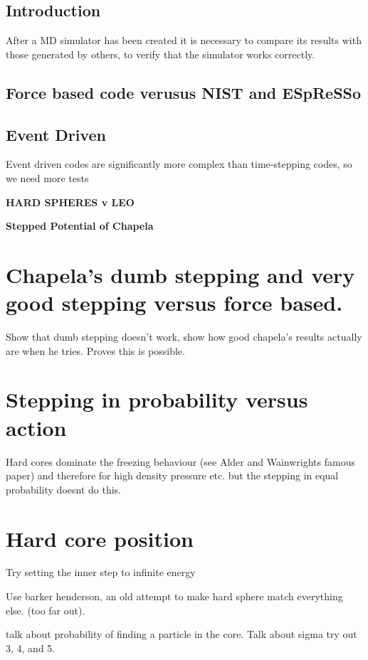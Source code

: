 \documentclass[12pt]{UoAthesis}
\begin{document}
\subsection{Introduction} 
After a MD simulator has been created it is necessary to compare its
results with those generated by others, to verify that the simulator
works correctly.

\subsection{Force based code verusus NIST and ESpReSSo}

\subsection{Event Driven}
Event driven codes are significantly more complex than time-stepping codes, so we need more tests

{\bf HARD SPHERES v LEO}

{\bf Stepped Potential of Chapela}

\section{Chapela's dumb stepping and very good stepping versus force based. }

Show that dumb stepping doesn't work, show how good chapela's results actually are when he tries. Proves this is possible.

\section{Stepping in probability versus action}

Hard cores dominate the freezing behaviour (see Alder and Wainwrights
famous paper) and therefore for high density pressure etc. but the stepping in equal probability doesnt do this.

\section{Hard core position}

Try setting the inner step to infinite energy

Use barker henderson, an old attempt to make hard sphere match
everything else. (too far out).


talk about probability of finding a particle in the core. Talk about
sigma try out 3, 4, and 5.
\end{document}
